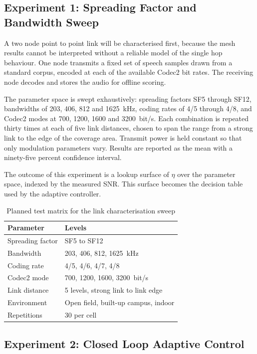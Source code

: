 \documentclass[a4paper,10pt]{article}
\begin{document}
\subsection{Experiment 1: Spreading Factor and Bandwidth Sweep}

A two node point to point link will be characterised first, because
the mesh results cannot be interpreted without a reliable model of the
single hop behaviour. One node transmits a fixed set of speech samples
drawn from a standard corpus, encoded at each of the available Codec2
bit rates. The receiving node decodes and stores the audio for offline
scoring.

The parameter space is swept exhaustively: spreading factors SF5
through SF12, bandwidths of 203, 406, 812 and 1625~kHz, coding rates
of 4/5 through 4/8, and Codec2 modes at 700, 1200, 1600 and
3200~bit/s. Each combination is repeated thirty times at each of five
link distances, chosen to span the range from a strong link to the
edge of the coverage area. Transmit power is held constant so that
only modulation parameters vary. Results are reported as the mean with
a ninety-five percent confidence interval.

The outcome of this experiment is a lookup surface of $\eta$ over the
parameter space, indexed by the measured SNR. This surface becomes the
decision table used by the adaptive controller.

\begin{table}[t]
\caption{Planned test matrix for the link characterisation sweep}
\label{tab:matrix}
\centering
\renewcommand{\arraystretch}{1.2}
\begin{tabular}{p{} p{}}
\toprule
\textbf{Parameter} & \textbf{Levels} \\
\midrule
Spreading factor & SF5 to SF12 \\
Bandwidth        & 203, 406, 812, 1625~kHz \\
Coding rate      & 4/5, 4/6, 4/7, 4/8 \\
Codec2 mode      & 700, 1200, 1600, 3200~bit/s \\
Link distance    & 5 levels, strong link to link edge \\
Environment      & Open field, built-up campus, indoor \\
Repetitions      & 30 per cell \\
\bottomrule
\end{tabular}
\end{table}

\subsection{Experiment 2: Closed Loop Adaptive Control}
\end{document}
